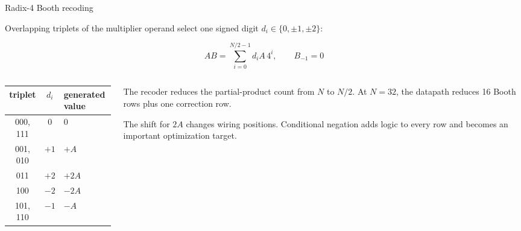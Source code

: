\documentclass[aspectratio=169,11pt]{beamer}
\begin{document}
\begin{frame}{Radix-4 Booth recoding}

Overlapping triplets of the multiplier operand select one signed digit
$d_i\in\{0,\pm1,\pm2\}$:

\[
A B = \sum_{i=0}^{N/2-1} d_i A\,4^i,
\qquad B_{-1}=0
\]

\begin{columns}[T]
\begin{column}{0.46\textwidth}
\centering\small
\begin{tabular}{@{}ccl@{}}
\toprule
triplet & $d_i$ & generated value \\
\midrule
000, 111 & $0$  & $0$ \\
001, 010 & $+1$ & $+A$ \\
011      & $+2$ & $+2A$ \\
100      & $-2$ & $-2A$ \\
101, 110 & $-1$ & $-A$ \\
\bottomrule
\end{tabular}
\end{column}

\begin{column}{0.50\textwidth}
\small
The recoder reduces the partial-product count from $N$ to $N/2$. At $N=32$,
the datapath reduces 16 Booth rows plus one correction row.

\vspace{7pt}
The shift for $2A$ changes wiring positions. Conditional negation adds logic
to every row and becomes an important optimization target.
\end{column}
\end{columns}

\end{frame}
\end{document}
